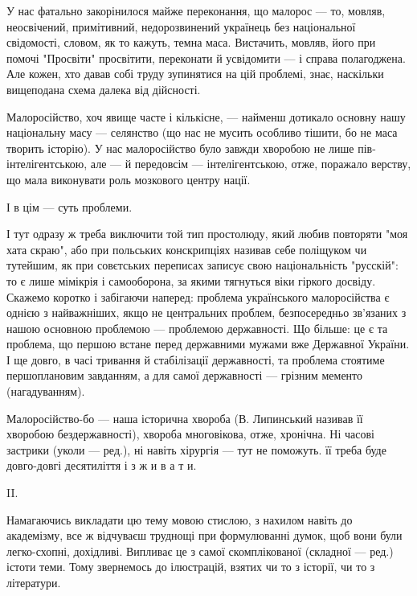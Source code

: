 У нас фатально закорінилося майже переконання, що малорос — то, мовляв,
неосвічений, примітивний, недорозвинений українець без національної свідомості,
словом, як то кажуть, темна маса. Вистачить, мовляв, його при помочі "Просвіти"
просвітити, переконати й усвідомити — і справа полагоджена. Але кожен, хто
давав собі труду зупинятися на цій проблемі, знає, наскільки вищеподана схема
далека від дійсності.

Малоросійство, хоч явище часте і кількісне, — найменш дотикало основну нашу
національну масу — селянство (що нас не мусить особливо тішити, бо не маса
творить історію). У нас малоросійство було завжди хворобою не лише
пів-інтелігентською, але — й передовсім — інтелігентською, отже, поражало
верству, що мала виконувати роль мозкового центру нації.

І в цім — суть проблеми.

І тут одразу ж треба виключити той тип простолюду, який любив повторяти "моя
хата скраю", або при польських конскрипціях називав себе поліщуком чи тутейшим,
як при совєтських переписах записує свою національність "русскій": то є лише
мімікрія і самооборона, за якими тягнуться віки гіркого досвіду. Скажемо
коротко і забігаючи наперед: проблема українського малоросійства є однією з
найважніших, якщо не центральних проблем, безпосередньо зв'язаних з нашою
основною проблемою — проблемою державності. Що більше: це є та проблема, що
першою встане перед державними мужами вже Державної України. І ще довго, в часі
тривання й стабілізації державності, та проблема стоятиме першоплановим
завданням, а для самої державності — грізним мементо (нагадуванням).

Малоросійство-бо — наша історична хвороба (В. Липинський називав її хворобою
бездержавності), хвороба многовікова, отже, хронічна. Ні часові застрики (уколи
— ред.), ні навіть хірургія — тут не поможуть. її треба буде довго-довгі
десятиліття і з ж и в а т и.

II.

Намагаючись викладати цю тему мовою стислою, з нахилом навіть до академізму,
все ж відчуваєш труднощі при формулюванні думок, щоб вони були легко-схопні,
дохідливі. Випливає це з самої скомплікованої (складної — ред.) істоти теми.
Тому звернемось до ілюстрацій, взятих чи то з історії, чи то з літератури.

